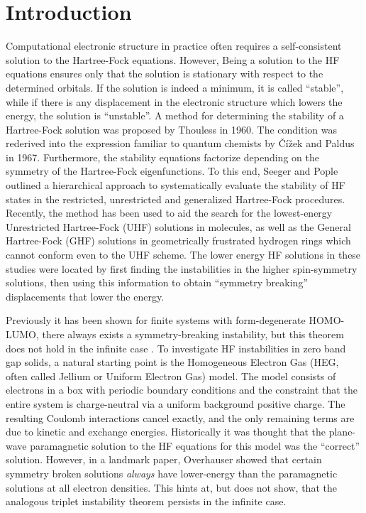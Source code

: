 \documentclass[preprint, journal=prl]{revtex4-1}
\begin{document}
\section{Introduction} 
  Computational electronic structure in practice often requires a self-consistent solution to the Hartree-Fock equations. However, Being a solution to the HF equations ensures only that the solution is stationary with respect to the determined orbitals. If the solution is indeed a minimum, it is called ``stable'', while if there is any displacement in the electronic structure which lowers the energy, the solution is ``unstable''. A method for determining the stability of a Hartree-Fock solution was proposed by Thouless in 1960\cite{Thouless1960}. The condition was rederived into the expression familiar to quantum chemists by Čížek and Paldus in 1967\cite{Cizek1967}. Furthermore, the stability equations factorize depending on the symmetry of the Hartree-Fock eigenfunctions. To this end, Seeger and Pople outlined a hierarchical approach to systematically evaluate the stability of HF states in the restricted, unrestricted and generalized Hartree-Fock procedures\cite{Seeger1977}. Recently, the method has been used to aid the search for the lowest-energy Unrestricted Hartree-Fock (UHF) solutions in molecules, as well as the General Hartree-Fock (GHF) solutions in geometrically frustrated hydrogen rings which cannot conform even to the UHF scheme\cite{Pulay2016, Goings2015}. The lower energy HF solutions in these studies were located by first finding the instabilities in the higher spin-symmetry solutions, then using this information to obtain ``symmetry breaking'' displacements that lower the energy.    
    
  Previously it has been shown for finite systems with form-degenerate HOMO-LUMO, there always exists a symmetry-breaking instability, but this theorem does not hold in the infinite case \cite{Yamada2015}. To investigate HF instabilities in zero band gap solids, a natural starting point is the Homogeneous Electron Gas (HEG, often called Jellium or Uniform Electron Gas) model. The model consists of electrons in a box with periodic boundary conditions  and the constraint that the entire system is charge-neutral via a uniform background positive  charge. The resulting Coulomb interactions cancel exactly, and the only remaining terms are due   to kinetic and exchange energies. Historically it was thought that the plane-wave paramagnetic solution to the HF equations for this model was the ``correct'' solution. However, in a landmark paper, Overhauser showed that certain symmetry broken solutions \emph{always} have lower-energy than the paramagnetic solutions at all electron densities\cite{Overhauser1962}. This hints at, but does not show, that the analogous triplet instability theorem persists in the infinite case.  
        
\end{document}
